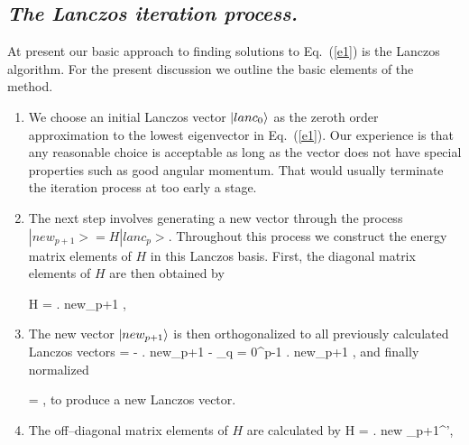 \subsection*{\it The Lanczos iteration process.}
%
At present our basic approach to finding solutions to Eq.~(\ref{e1})
is the Lanczos algorithm. 
For the present discussion we outline the basic elements
of the method.
\begin{enumerate}
%
\item We choose  an initial Lanczos vector $\left| lanc_0 \right\rangle$ as the zeroth order
approximation to the lowest eigenvector in Eq.~(\ref{e1}). Our experience
is that any  reasonable choice  is acceptable as long as the
vector does not have special properties such as good angular momentum.
That would usually terminate the iteration process at too early a
stage.
%
\item The next step involves generating a new  vector
through the process $|new_{p+1}> = H |lanc_p>$.
Throughout this process we construct the energy matrix elements
of $H$ in this Lanczos basis. First, the diagonal matrix elements of $H$
are then obtained by

%
\be
{} H  =  \left . new_{p+1} \right \rangle,
\label{lanc1}
\ee
%

\item The new vector $\left| new_{p+1} \right\rangle$ is then orthogonalized to all
previously calculated Lanczos vectors
%
\be
{} =  -  \cdot
	                 \left . new_{p+1} \right \rangle		 - \sum_{q = 0}^{p-1}  \cdot
	           \left . new_{p+1} \right \rangle,
\ee
%
and finally normalized

%
\be
{} = 
						,
\ee
%
to produce a new Lanczos vector.
%
\item The off--diagonal matrix elements of $H$ are calculated by
%
\be
{} H  = 
                                \left . new _{p+1}^{'}\right \rangle,
\label{off1}
\ee


\end{enumerate}
